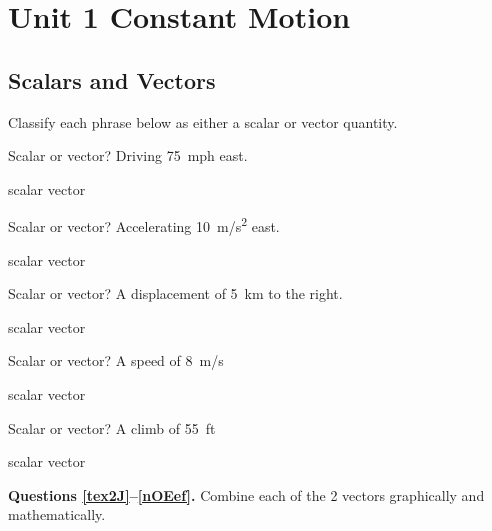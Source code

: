 \documentclass[]{exam}
\begin{document}
\section{Unit 1 Constant Motion}

\subsection{Scalars and Vectors}


Classify each phrase below as either a scalar or vector quantity.

\begin{questions}


\question
Scalar or vector? Driving \SI{75}{mph} east.

\begin{randomizechoices}[norandomize]
    \choice scalar
    \correctchoice vector
\end{randomizechoices}


\question
Scalar or vector? Accelerating \SI{10}{m/s^2} east.

\begin{randomizechoices}[norandomize]
    \choice scalar
    \correctchoice vector
\end{randomizechoices}


\question
Scalar or vector? A displacement of \SI{5}{km} to the right.

\begin{randomizechoices}[norandomize]
    \choice scalar
    \correctchoice vector
\end{randomizechoices}

\question 
Scalar or vector? A speed of \SI{8}{m/s}

\begin{randomizechoices}[norandomize]
    \correctchoice scalar
    \choice vector
\end{randomizechoices}

\question \label{scalar-last}
Scalar or vector?
A climb of \SI{55}{ft}

\begin{randomizechoices}[norandomize]
    \correctchoice scalar
    \choice vector
\end{randomizechoices}

\begin{EnvUplevel}
    \textbf{Questions \ref{tex2J}--\ref{nOEef}.} Combine each of the 2 vectors graphically and mathematically.
\end{EnvUplevel} 


\end{questions}
\end{document}
